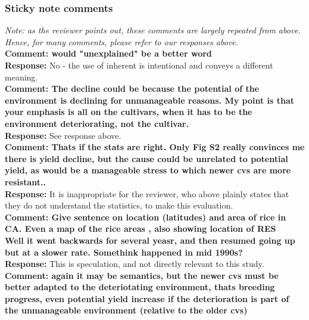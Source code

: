 \documentclass{article} \usepackage[margin=1in]{geometry}
\begin{document}
\subsubsection{Sticky note comments}

\textit{Note: as the reviewer points out, these comments are largely
  repeated from above. Hence, for many comments, please refer to our
  responses above.}\\

\textbf{Comment: would "unexplained" be a better word}\\

\textbf{Response:} No - the use of inherent is intentional and conveys
a different meaning.\\

\textbf{Comment: The decline could be because the potential of the
  environment is declining for unmanageable reasons. My point is that
  your emphasis is all on the cultivars, when it has to be the
  environment deteriorating, not the cultivar. }\\

\textbf{Response: } See response above.\\

\textbf{Comment: Thats if the stats are right. Only Fig S2 really
  convinces me there is yield decline, but the cause could be
  unrelated to potential yield, as would be a manageable stress to
  which newer cvs are more resistant..}\\

\textbf{Response: } It is inappropriate for the reviewer, who above plainly
states that they do not understand the statistics, to make this
evaluation.\\

\textbf{Comment: Give sentence on location (latitudes) and area of rice in
  CA. Even a map of the rice areas , also showing location of RES}\\


\textbf{Well it went backwards for several yeasr, and then resumed
  going up but at a slower rate. Somethink happened in mid 1990s?}\\

\textbf{Response: } This is speculation, and not directly relevant to
this study.\\

\textbf{Comment: again it may be semantics, but the newer cvs must be
  better adapted to the deteriotating environment, thats breeding
  progress, even potential yield increase if the deterioration is part
  of the unmanageable environment (relative to the older cvs)}\\
\end{document}
